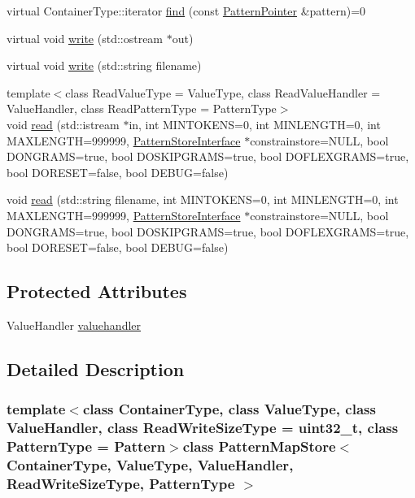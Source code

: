 \begin{DoxyCompactItemize}
\item 
virtual Container\+Type\+::iterator \hyperlink{classPatternMapStore_aa09480df06716f8e2b22972636d48c9e}{find} (const \hyperlink{classPatternPointer}{Pattern\+Pointer} \&pattern)=0
\item 
virtual void \hyperlink{classPatternMapStore_aa6400b6ff29f93c3e1c73355363c2476}{write} (std\+::ostream $\ast$out)
\item 
virtual void \hyperlink{classPatternMapStore_a42c82c250e9a070d148637f7f7966c12}{write} (std\+::string filename)
\item 
{\footnotesize template$<$class Read\+Value\+Type  = Value\+Type, class Read\+Value\+Handler  = Value\+Handler, class Read\+Pattern\+Type  = Pattern\+Type$>$ }\\void \hyperlink{classPatternMapStore_a70aaedef83737f6bb2aeb66e340b17c4}{read} (std\+::istream $\ast$in, int M\+I\+N\+T\+O\+K\+E\+N\+S=0, int M\+I\+N\+L\+E\+N\+G\+T\+H=0, int M\+A\+X\+L\+E\+N\+G\+T\+H=999999, \hyperlink{classPatternStoreInterface}{Pattern\+Store\+Interface} $\ast$constrainstore=N\+U\+L\+L, bool D\+O\+N\+G\+R\+A\+M\+S=true, bool D\+O\+S\+K\+I\+P\+G\+R\+A\+M\+S=true, bool D\+O\+F\+L\+E\+X\+G\+R\+A\+M\+S=true, bool D\+O\+R\+E\+S\+E\+T=false, bool D\+E\+B\+U\+G=false)
\item 
void \hyperlink{classPatternMapStore_a9d0b967b093500bcf37818306a02b7ef}{read} (std\+::string filename, int M\+I\+N\+T\+O\+K\+E\+N\+S=0, int M\+I\+N\+L\+E\+N\+G\+T\+H=0, int M\+A\+X\+L\+E\+N\+G\+T\+H=999999, \hyperlink{classPatternStoreInterface}{Pattern\+Store\+Interface} $\ast$constrainstore=N\+U\+L\+L, bool D\+O\+N\+G\+R\+A\+M\+S=true, bool D\+O\+S\+K\+I\+P\+G\+R\+A\+M\+S=true, bool D\+O\+F\+L\+E\+X\+G\+R\+A\+M\+S=true, bool D\+O\+R\+E\+S\+E\+T=false, bool D\+E\+B\+U\+G=false)
\end{DoxyCompactItemize}
\subsection*{Protected Attributes}
\begin{DoxyCompactItemize}
\item 
Value\+Handler \hyperlink{classPatternMapStore_a2a3346dbd7ce78c40ac26d12eeba5900}{valuehandler}
\end{DoxyCompactItemize}


\subsection{Detailed Description}
\subsubsection*{template$<$class Container\+Type, class Value\+Type, class Value\+Handler, class Read\+Write\+Size\+Type = uint32\+\_\+t, class Pattern\+Type = Pattern$>$class Pattern\+Map\+Store$<$ Container\+Type, Value\+Type, Value\+Handler, Read\+Write\+Size\+Type, Pattern\+Type $>$}

